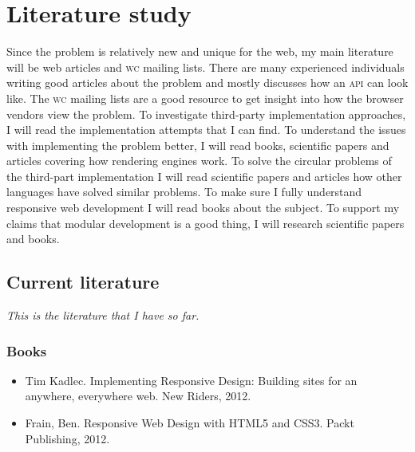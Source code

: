 \documentclass[oneside,a4paper,11pt]{kth-mag}
\begin{document}
\section*{Literature study}
Since the problem is relatively new and unique for the web, my main literature will be web articles and \textsc{w}\textsc{c} mailing lists. There are many experienced individuals writing good articles about the problem and mostly discusses how an \textsc{api} can look like. The \textsc{w}\textsc{c} mailing lists are a good resource to get insight into how the browser vendors view the problem. To investigate third-party implementation approaches, I will read the implementation attempts that I can find. To understand the issues with implementing the problem better, I will read books, scientific papers and articles covering how rendering engines work. To solve the circular problems of the third-part implementation I will read scientific papers and articles how other languages have solved similar problems. To make sure I fully understand responsive web development I will read books about the subject. To support my claims that modular development is a good thing, I will research scientific papers and books.

\subsection*{Current literature}
\emph{This is the literature that I have so far.}
\subsubsection*{Books}
\begin{itemize}
\item Tim Kadlec. Implementing Responsive Design: Building sites for an anywhere, everywhere web. New Riders, 2012.
\item Frain, Ben. Responsive Web Design with HTML5 and CSS3. Packt Publishing, 2012.
\end{itemize}
\end{document}
